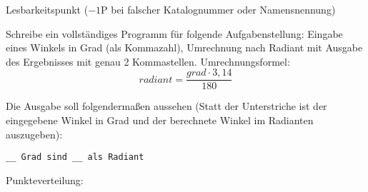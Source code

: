 \documentclass[11pt,a4paper]{exam}
\begin{document}


\begin{questions}


\renewcommand{\questionlabel}{}
\question[1]
Lesbarkeitspunkt ($-1$P bei falscher Katalognummer oder Namensnennung)
\setcounter{question}{0}
\renewcommand{\questionlabel}{\thequestion.}



\question
Schreibe ein vollständiges Programm für folgende Aufgabenstellung:
Eingabe eines Winkels in Grad (als Kommazahl), Umrechnung nach Radiant mit Ausgabe des Ergebnisses mit genau 2 Kommastellen. 
Umrechnungsformel:
\[radiant = \frac{grad \cdot 3,14}{180}\]

Die Ausgabe soll folgendermaßen aussehen (Statt der Unterstriche ist der eingegebene Winkel in Grad und der berechnete Winkel im Radianten auszugeben):
\begin{Verbatim}[frame=single]
__ Grad sind __ als Radiant
\end{Verbatim}


Punkteverteilung:


\drawGrid

\end{questions}

\myTestPunktetabelle

\myTestNotenschluessel
\end{document}
